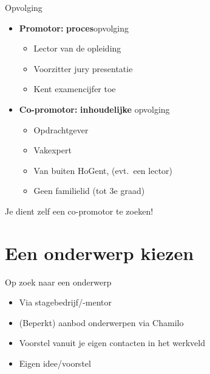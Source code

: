 \documentclass[aspectratio=169]{beamer}
\begin{document}
\begin{frame}{Opvolging}

  \begin{itemize}
    \item \textbf{Promotor:} \textbf{proces}opvolging
          \begin{itemize}
            \item Lector van de opleiding
            \item Voorzitter jury presentatie
            \item Kent examencijfer toe
          \end{itemize}
    \item \textbf{Co-promotor:} \textbf{inhoudelijke} opvolging
          \begin{itemize}
            \item Opdrachtgever
            \item Vakexpert
            \item Van buiten HoGent, (evt.\ een lector)
            \item Geen familielid (tot 3e graad)
          \end{itemize}
  \end{itemize}

  \bigskip

  Je dient zelf een co-promotor te zoeken!

\end{frame}

\section{Een onderwerp kiezen}

\begin{frame}{Op zoek naar een onderwerp}

  \begin{itemize}
    \item Via stagebedrijf/-mentor
    \item (Beperkt) aanbod onderwerpen via Chamilo
    \item Voorstel vanuit je eigen contacten in het werkveld
    \item Eigen idee/voorstel
  \end{itemize}

  \bigskip

\end{frame}
\end{document}
